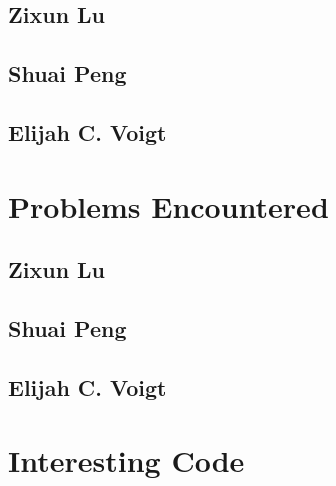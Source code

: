 \subsection{Zixun Lu}



\subsection{Shuai Peng}



\subsection{Elijah C. Voigt}




\section{Problems Encountered}

\subsection{Zixun Lu}



\subsection{Shuai Peng}



\subsection{Elijah C. Voigt}




\section{Interesting Code}

